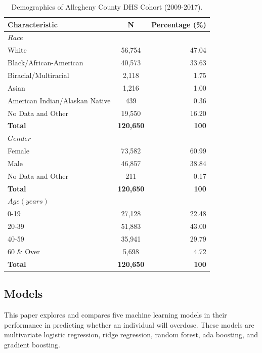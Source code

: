 \documentclass[twoside,10.5pt]{article}
\begin{document}
\begin{table}[h!]
  \begin{center}
    \caption{Demographics of Allegheny County DHS Cohort (2009-2017).}
    \label{tab:table1}
    \begin{tabular}{l|c|r} %
      \textbf{Characteristic} & \textbf{N} & \textbf{Percentage (\%)}\\
      \hline
      $Race$ & $ $ & $ $ \\
      White & 56,754 & 47.04\\
      Black/African-American & 40,573 & 33.63\\
      Biracial/Multiracial & 2,118 & 1.75\\
      Asian & 1,216 & 1.00\\
      American Indian/Alaskan Native & 439 & 0.36\\
      No Data and Other & 19,550 & 16.20\\
      \textbf{Total} & \textbf{120,650} & \textbf{100}\\
      \hline
      $Gender$ & $ $ & $ $ \\
      Female & 73,582 & 60.99\\
      Male & 46,857 & 38.84\\
      No Data and Other & 211 & 0.17\\
      \textbf{Total} & \textbf{120,650} & \textbf{100}\\
      \hline
      $Age (years)$ & $ $ & $ $\\
      0-19 & 27,128 & 22.48\\
      20-39 & 51,883 & 43.00\\
      40-59 & 35,941 &  29.79\\
      60 \& Over & 5,698 &   4.72\\
      \textbf{Total} & \textbf{120,650} & \textbf{100}\\
      \hline
    \end{tabular}
  \end{center}
\end{table}


\subsection{Models}
This paper explores and compares five machine learning models in their performance in predicting whether an individual will overdose. These models are multivariate logistic regression, ridge regression, random forest, ada boosting, and gradient boosting. 
\end{document}
